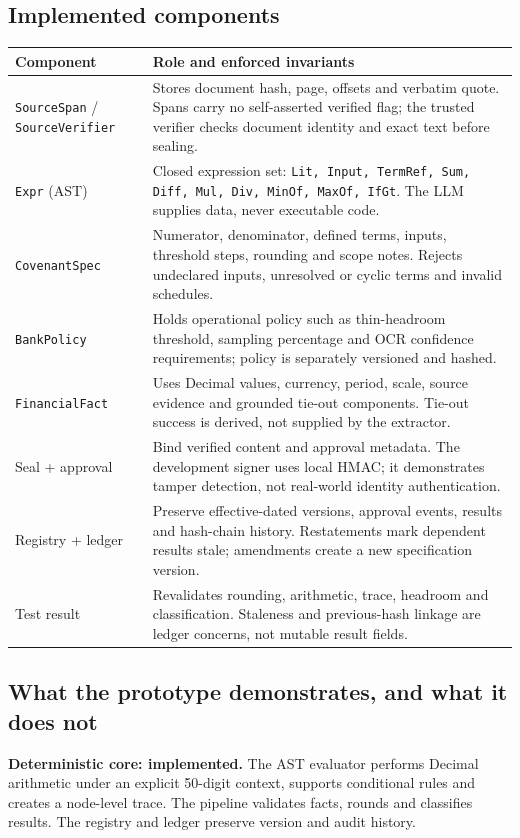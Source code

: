 \documentclass[10pt,letterpaper]{article}
\newcommand{\ct}[1]{\texttt{\small #1}}
\newcommand{\tabsize}{\footnotesize}
\begin{document}
\subsection{Implemented components}
\begin{tabularx}{\linewidth}{@{}L{3.0cm} Y@{}}
\toprule
\tabsize\textbf{Component} & \tabsize\textbf{Role and enforced invariants} \\
\midrule
\tabsize\ct{SourceSpan} / \ct{SourceVerifier} & \tabsize Stores document hash, page, offsets and verbatim quote. Spans carry no self-asserted verified flag; the trusted verifier checks document identity and exact text before sealing. \\
\tabsize\ct{Expr} (AST) & \tabsize Closed expression set: \ct{Lit, Input, TermRef, Sum, Diff, Mul, Div, MinOf, MaxOf, IfGt}. The LLM supplies data, never executable code. \\
\tabsize\ct{CovenantSpec} & \tabsize Numerator, denominator, defined terms, inputs, threshold steps, rounding and scope notes. Rejects undeclared inputs, unresolved or cyclic terms and invalid schedules. \\
\tabsize\ct{BankPolicy} & \tabsize Holds operational policy such as thin-headroom threshold, sampling percentage and OCR confidence requirements; policy is separately versioned and hashed. \\
\tabsize\ct{FinancialFact} & \tabsize Uses Decimal values, currency, period, scale, source evidence and grounded tie-out components. Tie-out success is derived, not supplied by the extractor. \\
\tabsize Seal + approval & \tabsize Bind verified content and approval metadata. The development signer uses local HMAC; it demonstrates tamper detection, not real-world identity authentication. \\
\tabsize Registry + ledger & \tabsize Preserve effective-dated versions, approval events, results and hash-chain history. Restatements mark dependent results stale; amendments create a new specification version. \\
\tabsize Test result & \tabsize Revalidates rounding, arithmetic, trace, headroom and classification. Staleness and previous-hash linkage are ledger concerns, not mutable result fields. \\
\bottomrule
\end{tabularx}

\subsection{What the prototype demonstrates, and what it does not}
\textbf{Deterministic core: implemented.} The AST evaluator performs Decimal arithmetic under an explicit 50-digit context, supports conditional rules and creates a node-level trace. The pipeline validates facts, rounds and classifies results. The registry and ledger preserve version and audit history.
\end{document}
